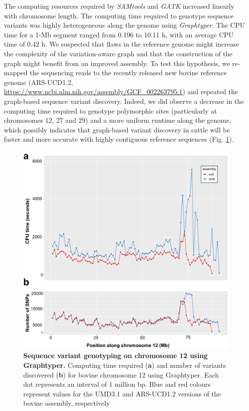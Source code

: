 \documentclass[../main.tex]{subfiles}
\begin{document}
The computing resources required by \emph{SAMtools} and \emph{GATK} increased linearly with chromosome length. 
The computing time required to genotype sequence variants was highly heterogeneous along the genome using \emph{Graphtyper}. 
The CPU time for a 1-Mb segment ranged from 0.196 to 10.11 h, with an average CPU time of 0.42 h. 
We suspected that flaws in the reference genome might increase the complexity of the variation-aware graph and that the construction of the graph might benefit from an improved assembly. 
To test this hypothesis, we re-mapped the sequencing reads to the recently released new bovine reference genome (ARS-UCD1.2, \url{https://www.ncbi.nlm.nih.gov/assembly/GCF_002263795.1}) and repeated the graph-based sequence variant discovery. 
Indeed, we did observe a decrease in the computing time required to genotype polymorphic sites (particularly at chromosomes 12, 27 and 29) and a more uniform runtime along the genome, which possibly indicates that graph-based variant discovery in cattle will be faster and more accurate with highly contiguous reference sequences (Fig. \ref{fig:varassemb}).


\begin{figure}[!htb]
    \centering
    \includegraphics[width=\textwidth]{paper1/main_figure/Figure5.pdf}
    \caption[Sequence variant genotyping on chromosome 12 using Graphtyper]{\textbf{Sequence variant genotyping on chromosome 12 using Graphtyper.} Computing time required (\textbf{a}) and number of variants discovered (\textbf{b}) for bovine chromosome 12 using Graphtyper. 
    Each dot represents an interval of 1 million bp. Blue and red colours represent values for the UMD3.1 and ARS-UCD1.2 versions of the bovine assembly, respectively}
    \label{fig:varassemb}
\end{figure}
\end{document}

